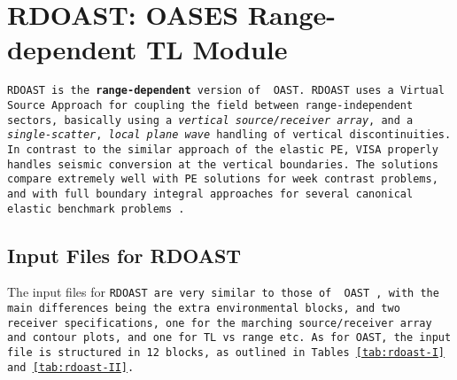 \section{    RDOAST: OASES Range-dependent TL Module}

\tt RDOAST \rm is the {\bf range-dependent} version of \tt
OAST. \rm 
\tt RDOAST \rm uses a Virtual Source Approach
for coupling the field between range-independent sectors, basically
using a {\em vertical source/receiver array}, and a {\em
single-scatter}, {\em local plane wave} handling of vertical
discontinuities. In contrast to the similar approach of the elastic
PE, VISA properly handles seismic conversion at the vertical
boundaries.  The solutions compare extremely well with PE solutions
for week contrast problems, and with full boundary integral approaches
for several canonical elastic benchmark problems \cite{Goh_96,Goh_97}.


\subsection{Input Files for RDOAST}

The input files for \tt RDOAST \rm are very similar to those of \tt
OAST \rm, with the main differences being the extra environmental
blocks, and two receiver specifications, one for the marching
source/receiver array and contour plots, and one for TL vs range etc.
As for OAST, the input file is structured in 12 blocks, as outlined in
Tables\,\ref{tab:rdoast-I} and \ref{tab:rdoast-II}. 

